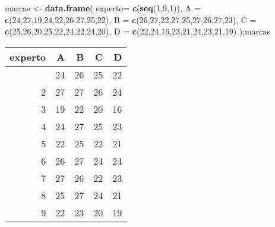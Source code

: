 \documentclass[
]{article}
\newenvironment{Shaded}{\begin{snugshade}}{\end{snugshade}}
\newcommand{\AttributeTok}[1]{\textcolor[rgb]{0.13,0.29,0.53}{#1}}
\newcommand{\DecValTok}[1]{\textcolor[rgb]{0.00,0.00,0.81}{#1}}
\newcommand{\FunctionTok}[1]{\textcolor[rgb]{0.13,0.29,0.53}{\textbf{#1}}}
\newcommand{\NormalTok}[1]{#1}
\newcommand{\OtherTok}[1]{\textcolor[rgb]{0.56,0.35,0.01}{#1}}
\begin{document}
\begin{Shaded}
\begin{Highlighting}[]
\NormalTok{marcas }\OtherTok{\textless{}{-}} \FunctionTok{data.frame}\NormalTok{(}
  \AttributeTok{experto=} \FunctionTok{c}\NormalTok{(}\FunctionTok{seq}\NormalTok{(}\DecValTok{1}\NormalTok{,}\DecValTok{9}\NormalTok{,}\DecValTok{1}\NormalTok{)),}
  \AttributeTok{A =} \FunctionTok{c}\NormalTok{(}\DecValTok{24}\NormalTok{,}\DecValTok{27}\NormalTok{,}\DecValTok{19}\NormalTok{,}\DecValTok{24}\NormalTok{,}\DecValTok{22}\NormalTok{,}\DecValTok{26}\NormalTok{,}\DecValTok{27}\NormalTok{,}\DecValTok{25}\NormalTok{,}\DecValTok{22}\NormalTok{),}
  \AttributeTok{B =} \FunctionTok{c}\NormalTok{(}\DecValTok{26}\NormalTok{,}\DecValTok{27}\NormalTok{,}\DecValTok{22}\NormalTok{,}\DecValTok{27}\NormalTok{,}\DecValTok{25}\NormalTok{,}\DecValTok{27}\NormalTok{,}\DecValTok{26}\NormalTok{,}\DecValTok{27}\NormalTok{,}\DecValTok{23}\NormalTok{),}
  \AttributeTok{C =} \FunctionTok{c}\NormalTok{(}\DecValTok{25}\NormalTok{,}\DecValTok{26}\NormalTok{,}\DecValTok{20}\NormalTok{,}\DecValTok{25}\NormalTok{,}\DecValTok{22}\NormalTok{,}\DecValTok{24}\NormalTok{,}\DecValTok{22}\NormalTok{,}\DecValTok{24}\NormalTok{,}\DecValTok{20}\NormalTok{),}
  \AttributeTok{D =} \FunctionTok{c}\NormalTok{(}\DecValTok{22}\NormalTok{,}\DecValTok{24}\NormalTok{,}\DecValTok{16}\NormalTok{,}\DecValTok{23}\NormalTok{,}\DecValTok{21}\NormalTok{,}\DecValTok{24}\NormalTok{,}\DecValTok{23}\NormalTok{,}\DecValTok{21}\NormalTok{,}\DecValTok{19}\NormalTok{)}
\NormalTok{);marcas}
\end{Highlighting}
\end{Shaded}

\begin{longtable}[]{@{}rrrrr@{}}
\toprule\noalign{}
experto & A & B & C & D \\
\midrule\noalign{}
\endhead
\bottomrule\noalign{}
\endlastfoot
1 & 24 & 26 & 25 & 22 \\
2 & 27 & 27 & 26 & 24 \\
3 & 19 & 22 & 20 & 16 \\
4 & 24 & 27 & 25 & 23 \\
5 & 22 & 25 & 22 & 21 \\
6 & 26 & 27 & 24 & 24 \\
7 & 27 & 26 & 22 & 23 \\
8 & 25 & 27 & 24 & 21 \\
9 & 22 & 23 & 20 & 19 \\
\end{longtable}
\end{document}
